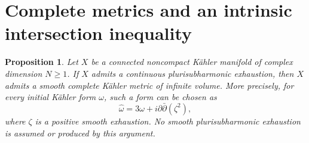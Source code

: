 \documentclass[11pt]{article}
\newtheorem{proposition}[theorem]{Proposition}
\theoremstyle{remark}
\begin{document}
\section{Complete metrics and an intrinsic intersection inequality}

\begin{proposition}\label{prop:complete-infinite-volume}
Let $X$ be a connected noncompact K\"ahler manifold of complex
dimension $N\geq1$. If $X$ admits a continuous plurisubharmonic
exhaustion, then $X$ admits a smooth complete K\"ahler metric of
infinite volume. More precisely, for every initial K\"ahler form
$\omega$, such a form can be chosen as
\[
 \widehat\omega=3\omega+i\partial\bar\partial(\zeta^2),
\]
where $\zeta$ is a positive smooth exhaustion. No smooth
plurisubharmonic exhaustion is assumed or produced by this argument.
\end{proposition}
\end{document}
